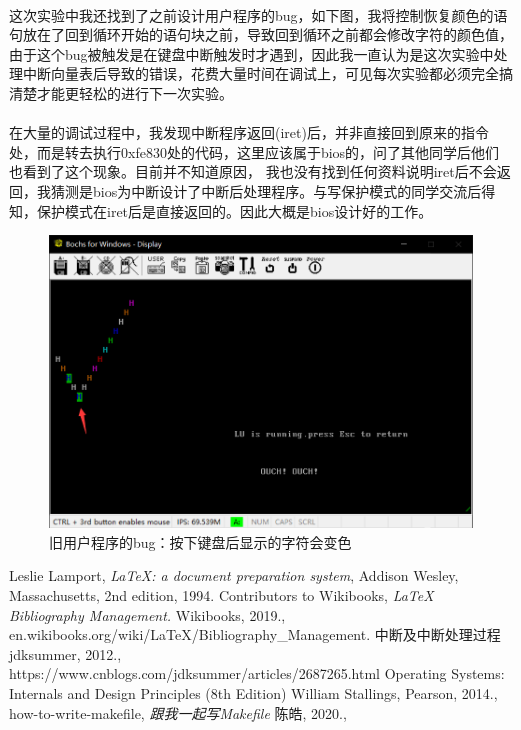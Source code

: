 \documentclass[a4paper, 11pt]{article} %
\begin{document}
\paragraph{}
这次实验中我还找到了之前设计用户程序的bug，如下图，我将控制恢复颜色的语句放在了回到循环开始的语句块之前，导致回到循环之前都会修改字符的颜色值，
由于这个bug被触发是在键盘中断触发时才遇到，因此我一直认为是这次实验中处理中断向量表后导致的错误，花费大量时间在调试上，可见每次实验都必须完全搞清楚才能更轻松的进行下一次实验。
\paragraph{}
在大量的调试过程中，我发现中断程序返回(iret)后，并非直接回到原来的指令处，而是转去执行0xfe830处的代码，这里应该属于bios的，问了其他同学后他们也看到了这个现象。目前并不知道原因，
我也没有找到任何资料说明iret后不会返回，我猜测是bios为中断设计了中断后处理程序。与写保护模式的同学交流后得知，保护模式在iret后是直接返回的。因此大概是bios设计好的工作。

\begin{figure}[H]
  \centering
  \includegraphics[width=0.8\linewidth]{olduserbug.png}
  \caption{旧用户程序的bug：按下键盘后显示的字符会变色}
  \label{fig:olduserbug}
\end{figure}

\begin{thebibliography}{99}
  
  Leslie Lamport,
  \textit{\LaTeX: a document preparation system},
  Addison Wesley, Massachusetts,
  2nd edition,
  1994.
  Contributors to Wikibooks,
  \textit{LaTeX Bibliography Management.}
  Wikibooks,
  2019., \\
  en.wikibooks.org/wiki/LaTeX/Bibliography\_Management.
  中断及中断处理过程
  jdksummer,
  2012., \\
  https://www.cnblogs.com/jdksummer/articles/2687265.html
  Operating Systems: Internals and Design Principles (8th Edition)
  William Stallings,
  Pearson,
  2014., \\
  how-to-write-makefile,
  \textit{跟我一起写Makefile}
  陈皓,
  2020., \\
 
\end{thebibliography}
\end{document}
